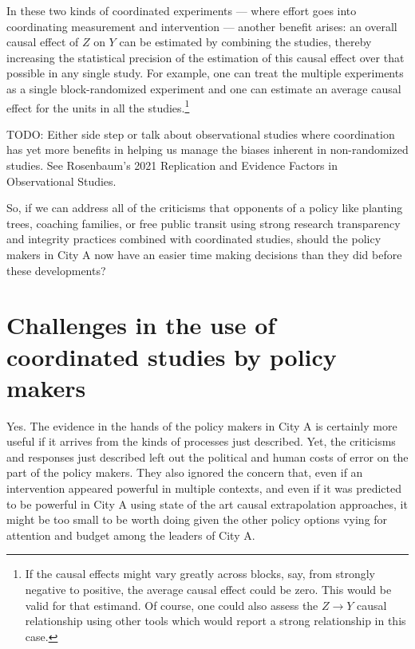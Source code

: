 \documentclass[
  11pt,
]{article}
\begin{document}
In these two kinds of coordinated experiments --- where effort goes into
coordinating measurement and intervention --- another benefit arises: an
overall causal effect of \(Z\) on \(Y\) can be estimated by combining
the studies, thereby increasing the statistical precision of the
estimation of this causal effect over that possible in any single study.
For example, one can treat the multiple experiments as a single
block-randomized experiment and one can estimate an average causal
effect for the units in all the studies.\footnote{If the causal effects
  might vary greatly across blocks, say, from strongly negative to
  positive, the average causal effect could be zero. This would be valid
  for that estimand. Of course, one could also assess the
  \(Z \rightarrow Y\) causal relationship using other tools which would
  report a strong relationship in this case.}

TODO: Either side step or talk about observational studies where
coordination has yet more benefits in helping us manage the biases
inherent in non-randomized studies. See Rosenbaum's 2021 Replication and
Evidence Factors in Observational Studies.

So, if we can address all of the criticisms that opponents of a policy
like planting trees, coaching families, or free public transit using
strong research transparency and integrity practices combined with
coordinated studies, should the policy makers in City A now have an
easier time making decisions than they did before these developments?

\hypertarget{challenges-in-the-use-of-coordinated-studies-by-policy-makers}{%
\section{Challenges in the use of coordinated studies by policy
makers}\label{challenges-in-the-use-of-coordinated-studies-by-policy-makers}}

Yes. The evidence in the hands of the policy makers in City A is
certainly more useful if it arrives from the kinds of processes just
described. Yet, the criticisms and responses just described left out the
political and human costs of error on the part of the policy makers.
They also ignored the concern that, even if an intervention appeared
powerful in multiple contexts, and even if it was predicted to be
powerful in City A using state of the art causal extrapolation
approaches, it might be too small to be worth doing given the other
policy options vying for attention and budget among the leaders of City
A.
\end{document}
